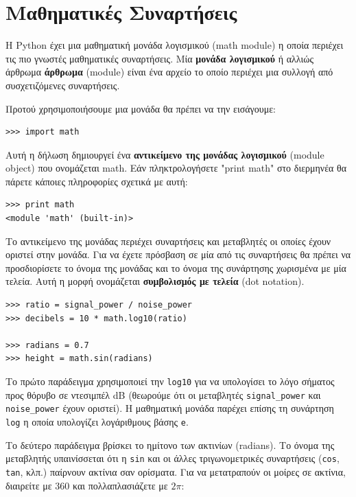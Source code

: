 \documentclass[10pt]{book}
\begin{document}
\section{Μαθηματικές Συναρτήσεις}
Η Python έχει μια μαθηματική μονάδα λογισμικού (math module) η οποία περιέχει τις πιο γνωστές μαθηματικές συναρτήσεις. Μία {\bf μονάδα λογισμικού} ή αλλιώς άρθρωμα {\bf άρθρωμα} (module) είναι ένα αρχείο το οποίο περιέχει μια συλλογή από συσχετιζόμενες συναρτήσεις.

Προτού χρησιμοποιήσουμε μια μονάδα θα πρέπει να την εισάγουμε:

\begin{verbatim}
>>> import math
\end{verbatim}
%

Αυτή η δήλωση δημιουργεί ένα {\bf αντικείμενο της μονάδας λογισμικού} (module object) που ονομάζεται math. Εάν πληκτρολογήσετε "print math" στο διερμηνέα θα πάρετε κάποιες πληροφορίες σχετικά με αυτή:

\begin{verbatim}
>>> print math
<module 'math' (built-in)>
\end{verbatim}
%

Το αντικείμενο της μονάδας περιέχει συναρτήσεις και μεταβλητές οι οποίες
έχουν οριστεί στην μονάδα. Για να έχετε πρόσβαση σε μία από τις συναρτήσεις 
θα πρέπει να προσδιορίσετε το όνομα της μονάδας και το όνομα της συνάρτησης 
χωρισμένα με μία τελεία. Αυτή η μορφή ονομάζεται {\bf συμβολισμός με τελεία} (dot notation).

\begin{verbatim}
>>> ratio = signal_power / noise_power
>>> decibels = 10 * math.log10(ratio)

>>> radians = 0.7
>>> height = math.sin(radians)
\end{verbatim}
%

Το πρώτο παράδειγμα χρησιμοποιεί την \verb"log10" για να υπολογίσει
το λόγο σήματος προς θόρυβο σε ντεσιμπέλ  dB  (θεωρούμε ότι οι μεταβλητές 
\verb"signal_power" και \verb"noise_power" έχουν οριστεί). Η
μαθηματική μονάδα παρέχει επίσης τη συνάρτηση {\tt log} η οποία υπολογίζει
λογάριθμους βάσης {\tt e}.


Το δεύτερο παράδειγμα βρίσκει το ημίτονο των ακτινίων  (radians). 
Το όνομα της μεταβλητής υπαινίσσεται ότι η  {\tt sin}  και οι άλλες
τριγωνομετρικές συναρτήσεις ({\tt cos}, {\tt tan}, κλπ.) παίρνουν
ακτίνια σαν ορίσματα. Για να μετατραπούν οι μοίρες σε ακτίνια, διαιρείτε
με 360 και πολλαπλασιάζετε με $2 \pi$:
\end{document}
